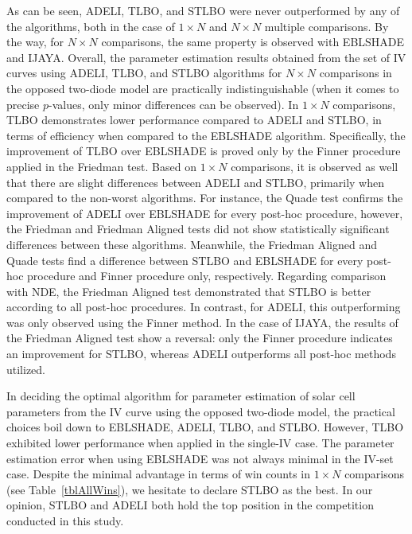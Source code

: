 \documentclass[a4paper,fleqn]{cas-sc}
\begin{document}
As can be seen,
ADELI, TLBO, and STLBO were never outperformed by any of the algorithms,
both in the case of $1\times N$ and $N\times N$ multiple comparisons.
By the way, for $N\times N$ comparisons, the same property is observed with EBLSHADE and IJAYA.
Overall, the parameter estimation results obtained from the set of IV curves
using ADELI, TLBO, and STLBO algorithms for $N\times N$ comparisons in the opposed two-diode model are practically indistinguishable
(when it comes to precise $p$-values, only minor differences can be observed).
In $1\times N$ comparisons, TLBO demonstrates lower performance compared to ADELI and STLBO,
in terms of efficiency when compared to the EBLSHADE algorithm.
Specifically, the improvement of TLBO over EBLSHADE is proved only by the Finner procedure applied in the Friedman test.
Based on $1\times N$ comparisons, it is observed as well that there are slight differences between ADELI and STLBO,
primarily when compared to the non-worst algorithms.
For instance, the Quade test confirms the improvement of ADELI over EBLSHADE for every post-hoc procedure,
however, the Friedman and Friedman Aligned tests did not show statistically significant differences between these algorithms.
Meanwhile, the Friedman Aligned and Quade tests find a difference between STLBO and EBLSHADE
for every post-hoc procedure and Finner procedure only, respectively.
Regarding comparison with NDE, the Friedman Aligned test demonstrated that STLBO is better according to all post-hoc procedures.
In contrast, for ADELI, this outperforming was only observed using the Finner method.
In the case of IJAYA,
the results of the Friedman Aligned test show a reversal:
only the Finner procedure indicates an improvement for STLBO,
whereas ADELI outperforms all post-hoc methods utilized.

In deciding the optimal algorithm for parameter estimation of solar cell parameters
from the IV curve using the opposed two-diode model,
the practical choices boil down to EBLSHADE, ADELI, TLBO, and STLBO.
However, TLBO exhibited lower performance when applied in the single-IV case.
The parameter estimation error when using EBLSHADE was not always minimal in the IV-set case.
Despite the minimal advantage in terms of win counts in $1\times N$ comparisons
(see Table~\ref{tblAllWins}),
we hesitate to declare STLBO as the best.
In our opinion, STLBO and ADELI both hold the top position in the competition conducted in this study.
\end{document}

